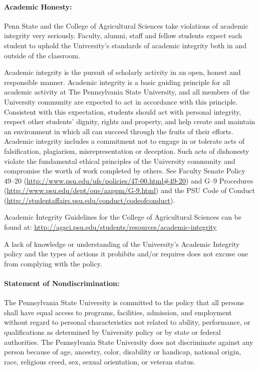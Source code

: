 \documentclass[11pt]{article}
\begin{document}
\paragraph{Academic Honesty:} Penn State and the College of Agricultural Sciences take violations of academic integrity very seriously. Faculty, alumni, staff and fellow students expect each student to uphold the University's standards of academic integrity both in and outside of the classroom.

Academic integrity is the pursuit of scholarly activity in an open, honest and responsible manner. Academic integrity is a basic guiding principle for all academic activity at The Pennsylvania State University, and all members of the University community are expected to act in accordance with this principle. Consistent with this expectation, students should act with personal integrity, respect other students' dignity, rights and property, and help create and maintain an environment in which all can succeed through the fruits of their efforts. Academic integrity includes a commitment not to engage in or tolerate acts of falsification, plagiarism, misrepresentation or deception. Such acts of dishonesty violate the fundamental ethical principles of the University community and compromise the worth of work completed by others. See Faculty Senate Policy 49--20 (\url{http://www.psu.edu/ufs/policies/47-00.html#49-20}) and G--9 Procedures (\url{http://www.psu.edu/dept/oue/aappm/G-9.html}) and the PSU Code of Conduct (\url{http://studentaffairs.psu.edu/conduct/codeofconduct}).

Academic Integrity Guidelines for the College of Agricultural Sciences can be found at: \url{http://agsci.psu.edu/students/resources/academic-integrity}

A lack of knowledge or understanding of the University's Academic Integrity policy and the types of actions it prohibits and/or requires does not excuse one from complying with the policy.

\paragraph{Statement of Nondiscrimination:} The Pennsylvania State University is committed to the policy that all persons shall have equal access to programs, facilities, admission, and employment without regard to personal characteristics not related to ability, performance, or qualifications as determined by University policy or by state or federal authorities. The Pennsylvania State University does not discriminate against any person because of age, ancestry, color, disability or handicap, national origin, race, religious creed, sex, sexual orientation, or veteran status.
\end{document}
